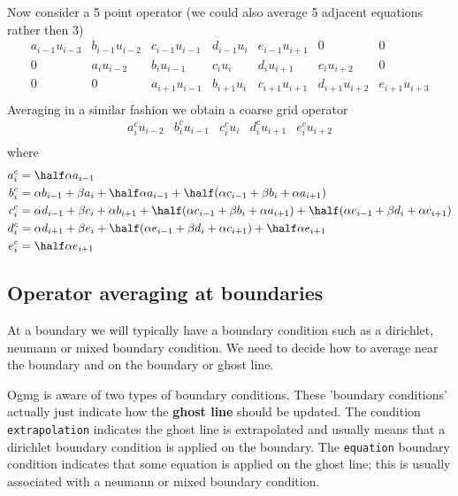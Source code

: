 \documentclass[12pt]{article}
\begin{document}
Now consider a 5 point operator (we could also average 5 adjacent equations rather then 3)
\[
   \begin{matrix}
a_{i-1}u_{i-3}& b_{i-1}u_{i-2}& c_{i-1} u_{i-1}& d_{i-1} u_{i} & e_{i-1} u_{i+1} &  0              & 0 \\
    0         & a_i u_{i-2}   & b_i u_{i-1}    & c_i u_{i  }   & d_{i  } u_{i+1} & e_{i  } u_{i+2} & 0\\
    0         &       0       & a_{i+1} u_{i-1}& b_{i+1}u_{i}  & c_{i+1}u_{i+1}  & d_{i+1} u_{i+2} & e_{i+1} u_{i+3} \\
    \end{matrix}
\]
Averaging in a similar fashion we obtain a coarse grid operator
\[
   \begin{matrix}
    a_i^c u_{i-2}   & b_i^c u_{i-1}    & c_i^c u_{i}  & d_{i}^c u_{i+1} & e_{i}^c u_{i+2} \\
    \end{matrix}
\]
where
\begin{align*}
   a_i^c &= \half\alpha a_{i-1} \\  
   b_i^c &=  \alpha b_{i-1} + \beta a_i + \half \alpha a_{i-1}+
                \half( \alpha c_{i-1} + \beta b_i + \alpha a_{i+1} )      \\
   c_i^c &= \alpha d_{i-1} + \beta c_i +\alpha b_{i+1} +
               \half( \alpha c_{i-1} + \beta b_i + \alpha a_{i+1} ) +
               \half( \alpha e_{i-1} + \beta d_i + \alpha c_{i+1} ) \\
   d_i^c &=  \alpha d_{i+1} + \beta e_i +
              \half( \alpha e_{i-1} + \beta d_i + \alpha c_{i+1} ) +
               \half\alpha e_{i+1} \\
   e_i^c &= \half\alpha e_{i+1} \\  
\end{align*}


\subsection{Operator averaging at boundaries}

   At a boundary we will typically have a boundary condition such as a dirichlet, neumann or mixed boundary
condition. We need to decide how to average near the boundary and on the boundary or ghost line.

Ogmg is aware of two types of boundary conditions. These 'boundary conditions' actually
just indicate how the {\bf ghost line} should be updated. The condition {\tt extrapolation} indicates the 
ghost line is extrapolated and usually means that a dirichlet boundary condition is applied on
the boundary. The {\tt equation} boundary condition indicates that some equation is applied on
the ghost line; this is usually associated with a neumann or mixed boundary condition.
\end{document}

